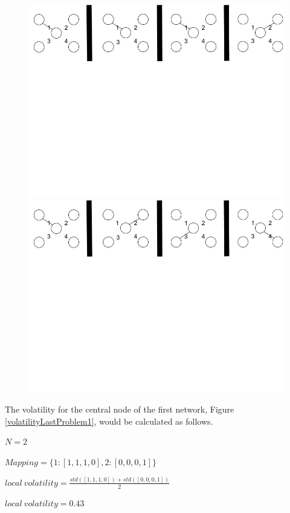 \begin{figure}[h!]
  \begin{center}
  \includegraphics[trim={0 15cm 0 -1cm}, width=120mm]{./Figures/volatilityLastProblem1.jpg}
  \end{center}
  \caption{}
  \label{volatilityLastProblem1}
  \begin{center}
  \includegraphics[trim={0 15cm 0 -1cm}, width=120mm]{./Figures/volatilityLastProblem2.jpg}
  \end{center}
  \caption{}
  \label{volatilityLastProblem2}
\end{figure}

The volatility for the central node of the first network, Figure \ref{volatilityLastProblem1}, would be calculated as follows.

\begin{center}
$N = 2$

$Mapping = \{1:[1, 1, 1, 0], 2:[0, 0, 0, 1]\}$

$local\ volatility = \frac{std([1,1,1,0]) + std([0,0,0,1])}{2}$

$local\ volatility = 0.43$
\end{center}

